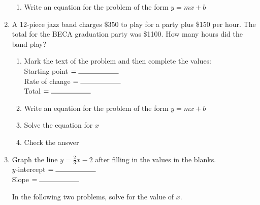 \documentclass[12pt, oneside]{article}
\begin{document}
\begin{enumerate}
\begin{enumerate}
    \item Write an equation for the problem of the form $y=mx+b$\\[1.5cm]

  \end{enumerate}

  \item A 12-piece jazz band charges \$350 to play for a party plus \$150 per hour. The total for the BECA graduation party was \$1100. How many hours did the band play?
  \begin{enumerate}
    \item Mark the text of the problem and then complete the values:\\[0.5cm]
    Starting point $= \rule{2cm}{0.15mm}$ \\[0.5cm]
    Rate of change $= \rule{2cm}{0.15mm}$ \\[0.5cm]
    Total $= \rule{2cm}{0.15mm}$ \\

    \item Write an equation for the problem of the form $y=mx+b$\\[1.5cm]
    \item Solve the equation for $x$ \vspace{3.5cm}
    \item Check the answer \vspace{2.5cm}
  \end{enumerate}

\newpage
\item Graph the line $y=\frac{2}{3} x -2$ after filling in the values in the blanks.\\[0.85cm]
      $y$-intercept $= \rule{2cm}{0.15mm}$ \\[0.5cm]
      Slope $= \rule{2cm}{0.15mm}$

\begin{center} %
\end{center}

In the following two problems, solve for the value of $x$.



\end{enumerate}
\end{document}
